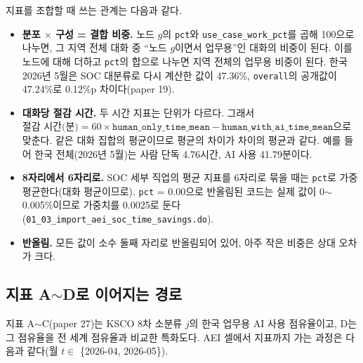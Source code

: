 \documentclass[11pt]{article}
\begin{document}
지표를 조합할 때 쓰는 관계는 다음과 같다.
\begin{itemize}[leftmargin=*]
  \item \textbf{분포 $\times$ 구성 = 결합 비중.} 노드 $g$의 \texttt{pct}와 \texttt{use\_case\_work\_pct}를 곱해 100으로 나누면, 그 지역 전체 대화 중 ``노드 $g$이면서 업무용''인 대화의 비중이 된다. 이를 노드에 대해 더하고 \texttt{pct}의 합으로 나누면 지역 전체의 업무용 비중이 된다. 한국 2026년 5월은 SOC 대분류로 다시 계산한 값이 47.36\%, \texttt{overall}의 공개값이 47.24\%로 0.12\%p 차이다(paper 19).
  \item \textbf{대화당 절감 시간.} 두 시간 지표는 단위가 다르다. 그래서 $\text{절감 시간(분)} = 60 \times \texttt{human\_only\_time\_mean} - \texttt{human\_with\_ai\_time\_mean}$으로 맞춘다. 같은 대화 집합의 평균이므로 평균의 차이가 차이의 평균과 같다. 예를 들어 한국 전체(2026년 5월)는 사람 단독 4.76시간, AI 사용 41.79분이다.
  \item \textbf{8자리에서 6자리로.} SOC 세부 직업의 평균 지표를 6자리로 묶을 때는 \texttt{pct}로 가중평균한다(대화 평균이므로). \texttt{pct} = 0.00으로 반올림된 코드는 실제 값이 0$\sim$0.005\%이므로 가중치를 0.0025로 둔다(\texttt{01\_03\_import\_aei\_soc\_time\_savings.do}).
  \item \textbf{반올림.} 모든 값이 소수 둘째 자리로 반올림되어 있어, 아주 작은 비중은 상대 오차가 크다.
\end{itemize}

\subsection{지표 A$\sim$D로 이어지는 경로}

지표 A$\sim$C(paper 27)는 KSCO 8차 소분류 $j$의 한국 업무용 AI 사용 점유율이고, D는 그 점유율을 전 세계 점유율과 비교한 특화도다. AEI 셀에서 지표까지 가는 과정은 다음과 같다(월 $t \in$ \{2026-04, 2026-05\}).
\end{document}
